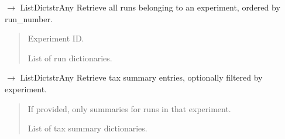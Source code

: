 \documentclass[letterpaper,10pt,english]{sphinxmanual}
\begin{document}
\begin{fulllineitems}
\begin{fulllineitems}
\label{\detokenize{core.database.manager_oldversion:core.database.manager_oldversion.DatabaseManager.get_runs_by_experiment}}
\pysigstartsignatures
\pysiglinewithargsret
{}
{}
{{ $\rightarrow$ List\DUrole{p}{{[}}Dict\DUrole{p}{{[}}strAny\DUrole{p}{{]}}\DUrole{p}{{]}}}}
\pysigstopsignatures
\sphinxAtStartPar
Retrieve all runs belonging to an experiment, ordered by run\_number.
\begin{quote}\begin{description}
\sphinxAtStartPar
{} \textendash{} Experiment ID.

\sphinxAtStartPar
List of run dictionaries.

\end{description}\end{quote}

\end{fulllineitems}


\begin{fulllineitems}
\label{\detokenize{core.database.manager_oldversion:core.database.manager_oldversion.DatabaseManager.get_tax_summaries}}
\pysigstartsignatures
\pysiglinewithargsret
{}
{}
{{ $\rightarrow$ List\DUrole{p}{{[}}Dict\DUrole{p}{{[}}strAny\DUrole{p}{{]}}\DUrole{p}{{]}}}}
\pysigstopsignatures
\sphinxAtStartPar
Retrieve tax summary entries, optionally filtered by experiment.
\begin{quote}\begin{description}
\sphinxAtStartPar
{} \textendash{} If provided, only summaries for runs in that experiment.

\sphinxAtStartPar
List of tax summary dictionaries.


\end{description}
\end{quote}
\end{fulllineitems}
\end{fulllineitems}
\end{document}
